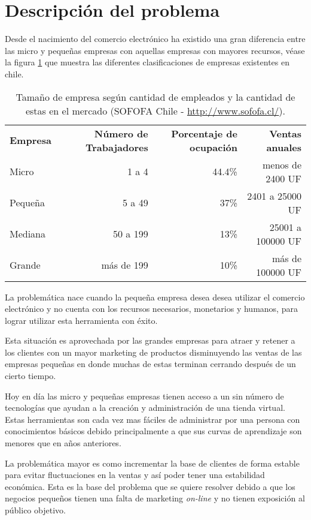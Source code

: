 \section{Descripción del problema}

Desde el nacimiento del comercio electrónico ha existido una gran diferencia
entre las micro y pequeñas empresas con aquellas empresas con mayores recursos,
véase la figura \ref{tab:tam_empresa} que muestra las diferentes clasificaciones
de empresas existentes en chile.

\begin{table}[h]
\centering
\begin{tabular}{lrrr}
{\bf Empresa}  & {\bf Número de Trabajadores} & {\bf Porcentaje de ocupación} & {\bf Ventas anuales}\\
Micro    & 1 a 4                & 44.4\%  & menos de 2400 UF\\
Pequeña  & 5 a 49               & 37\%  & 2401 a 25000 UF\\
Mediana  & 50 a 199             & 13\%  & 25001 a 100000 UF\\
Grande   & más de 199           & 10\%  & más de 100000 UF\\
\end{tabular}
\caption[TamañoEmpresa]{Tamaño de empresa según cantidad de empleados y
la cantidad de estas en el mercado (SOFOFA Chile - \url{http://www.sofofa.cl/}).}
\label{tab:tam_empresa}
\end{table}


La problemática nace cuando la pequeña empresa desea desea utilizar el comercio
electrónico y no cuenta con los recursos necesarios, monetarios y humanos,
para lograr utilizar esta herramienta con éxito.

Esta situación es aprovechada por las grandes empresas para atraer y retener a los
clientes con un mayor marketing de productos disminuyendo las ventas de las
empresas pequeñas en donde muchas de estas terminan cerrando después de un cierto
tiempo.

Hoy en día las micro y pequeñas empresas tienen acceso a un sin número de
tecnologías que ayudan a la creación y administración de una tienda virtual.
Estas herramientas son cada vez mas fáciles de administrar por una persona
con conocimientos básicos debido principalmente a que sus curvas de aprendizaje
son menores que en años anteriores.

La problemática mayor es como incrementar la base de clientes de forma estable
para evitar fluctuaciones en la ventas y así poder tener una estabilidad económica.
Esta es la base del problema que se quiere resolver debido a que los negocios
pequeños tienen una falta de marketing \emph{on-line} y no tienen exposición al público
objetivo.

